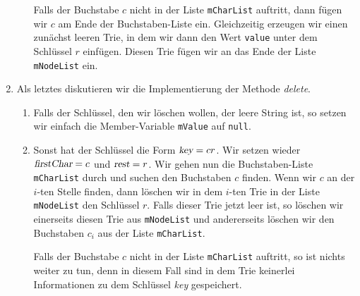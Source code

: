 \begin{enumerate}
\begin{enumerate}
            Falls der Buchstabe $c$ nicht in der Liste \texttt{mCharList} auftritt,
            dann f\"ugen wir $c$ am Ende der Buchstaben-Liste ein.  Gleichzeitig erzeugen
            wir einen zun\"achst leeren Trie, in dem wir dann den Wert \texttt{value} unter dem
            Schl\"ussel $r$ einf\"ugen.  Diesen Trie f\"ugen wir an das Ende der Liste
            \texttt{mNodeList} ein.            
      \end{enumerate}
\item Als letztes diskutieren wir die Implementierung der Methode \textsl{delete}.
      \begin{enumerate}
      \item Falls der Schl\"ussel, den wir l\"oschen wollen, der
            leere String ist, so setzen wir einfach die Member-Variable \texttt{mValue}
            auf \texttt{null}.
      \item Sonst hat der Schl\"ussel die Form $\textsl{key} = cr$. Wir setzen wieder
            $\textsl{firstChar} = c$ und $\textsl{rest} = r$.  Wir gehen nun die
            Buchstaben-Liste \texttt{mCharList} durch und suchen den Buchstaben $c$
            finden.  Wenn wir $c$ an der $i$-ten 
            Stelle finden, dann l\"oschen wir in dem $i$-ten Trie in der Liste 
            \texttt{mNodeList} den Schl\"ussel $r$.  Falls dieser Trie jetzt leer ist,
            so l\"oschen wir einerseits diesen Trie aus \texttt{mNodeList} und andererseits
            l\"oschen wir den Buchstaben $c_i$ aus der Liste \texttt{mCharList}.

            Falls der Buchstabe $c$ nicht in der Liste \texttt{mCharList} auftritt,
            so ist nichts weiter zu tun, denn in diesem Fall sind in dem Trie keinerlei
            Informationen zu dem Schl\"ussel \textsl{key} gespeichert.
      \end{enumerate}
\end{enumerate}

